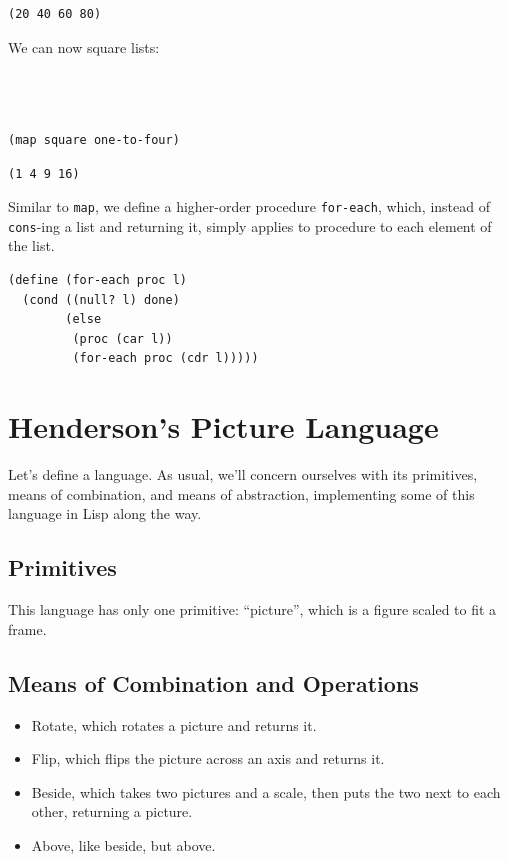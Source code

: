 \documentclass[9pt]{report}
\begin{document}
\begin{verbatim}
(20 40 60 80)
\end{verbatim}


We can now square lists:
\begin{verbatim}



(map square one-to-four)
\end{verbatim}

\begin{verbatim}
(1 4 9 16)
\end{verbatim}


Similar to \texttt{map}, we define a higher-order procedure \texttt{for-each},
which, instead of \texttt{cons}-ing a list and returning it, simply
applies to procedure to each element of the list.

\begin{verbatim}
(define (for-each proc l)
  (cond ((null? l) done)
        (else
         (proc (car l))
         (for-each proc (cdr l)))))
\end{verbatim}

\section{Henderson's Picture Language}
\label{sec:org288fae5}

Let's define a language. As usual, we'll concern ourselves with its
primitives, means of combination, and means of abstraction,
implementing some of this language in Lisp along the way.


\subsection{Primitives}
\label{sec:orgcc2b29f}
This language has only one primitive: ``picture'', which is a figure
scaled to fit a frame.


\subsection{Means of Combination and Operations}
\label{sec:orgdd8c255}

\begin{itemize}
\item Rotate, which rotates a picture and returns it.
\item Flip, which flips the picture across an axis and returns it.
\item Beside, which takes two pictures and a scale, then puts the two
next to each other, returning a picture.
\item Above, like beside, but above.
\end{itemize}
\end{document}
